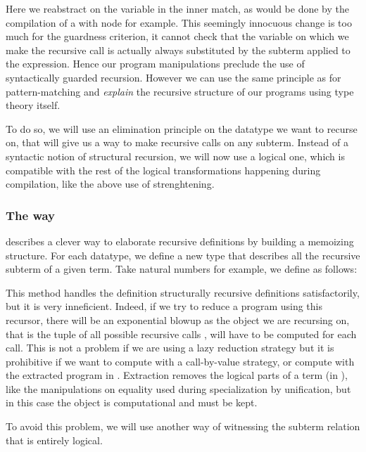 Here we reabstract on the  variable in the inner match, as would
be done by the compilation of a with node for example. This seemingly 
innocuous change is too much for the guardness criterion, it cannot
check that the  variable on which we make the recursive call
is actually always substituted by the subterm  applied to
the  expression. Hence our program manipulations preclude
the use of syntactically guarded recursion. However we 
can use the same principle as for pattern-matching and 
\emph{explain} the recursive structure of our programs using type theory
itself. 

To do so, we will use an elimination principle on the datatype we want
to recurse on, that will give us a way to make recursive calls on any
subterm. Instead of a syntactic notion of structural recursion, we will now use a
logical one, which is compatible with the rest of the logical
transformations happening during compilation, like the above use of
strenghtening.

\subsubsection{The \Below way}

\cite{DBLP:conf/birthday/GoguenMM06} describes a clever way to
elaborate recursive definitions by building a memoizing structure. 
For each datatype, we define a new type  that describes all
the recursive subterm of a given term. Take natural numbers for example,
we define  as follows:



This method handles the definition structurally recursive definitions
satisfactorily, but it is very inneficient. Indeed, if we try to reduce 
a program using this recursor, there will be an exponential blowup as 
the object we are recursing on, that is the tuple of all possible
recursive calls , will have to be computed for each call. This is not 
a problem if we are using a lazy reduction strategy but it is
prohibitive if we want to compute with a call-by-value strategy, 
or compute with the extracted program in \ML. Extraction removes the 
logical parts of a term (in \Prop), like the manipulations on equality
used during specialization by unification, but in this case the
 object is computational and must be kept.

To avoid this problem, we will use another way of witnessing the subterm
relation that is entirely logical.

